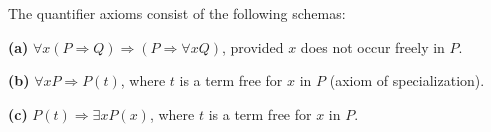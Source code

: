 The quantifier axioms consist of the following schemas:

\textbf{(a)} $\forall x (P \Rightarrow Q) \Rightarrow (P \Rightarrow \forall x Q)$, provided $x$ does not occur freely in $P$.

\textbf{(b)} $\forall x P \Rightarrow P(t)$, where $t$ is a term free for $x$ in $P$ (axiom of specialization).

\textbf{(c)} $P(t) \Rightarrow \exists x P(x)$, where $t$ is a term free for $x$ in $P$.
